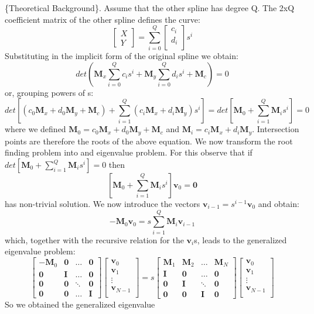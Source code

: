 \{Theoretical Background\}. Assume that the other spline has degree Q. The 2x\+Q coefficient matrix of the other spline defines the curve\+: \[ \left[\begin{array}{c} X\\ Y \end{array}\right]=\sum_{i=0}^Q \left[\begin{array}{c} c_i\\ d_i\\ \end{array}\right]s^i \] Substituting in the implicit form of the original spline we obtain\+: \[ det\left(\mathbf{M}_x\sum_{i=0}^Qc_is^i+\mathbf{M}_y\sum_{i=0}^Qd_is^i+\mathbf{M}_c\right)=0 \] or, grouping powers of s\+: \[ det\left[\left(c_0\mathbf{M}_x+d_0\mathbf{M}_y+\mathbf{M}_c\right)+\sum_{i=1}^Q\left(c_i\mathbf{M}_x+d_i\mathbf{M}_y\right)s^i\right] =det\left[\mathbf{M}_0+\sum_{i=1}^Q\mathbf{M}_is^i\right]=0 \] where we defined $\mathbf{M}_0=c_0\mathbf{M}_x+d_0\mathbf{M}_y+\mathbf{M}_c$ and $\mathbf{M}_i=c_i\mathbf{M}_x+d_i\mathbf{M}_y$. Intersection points are therefore the roots of the above equation. We now transform the root finding problem into and eigenvalue problem. For this observe that if $det\left[\mathbf{M}_0+\sum_{i=1}^Q\mathbf{M}_is^i\right]=0$ then \[ \left[\mathbf{M}_0+\sum_{i=1}^Q\mathbf{M}_is^i\right] \mathbf{v}_0=\mathbf{0} \] has non-\/trivial solution. We now introduce the vectors $\mathbf{v}_{i-1}=s^{i-1}\mathbf{v}_0$ and obtain\+: \[ -\mathbf{M}_0\mathbf{v}_0 = s\sum_{i=1}^Q\mathbf{M}_i\mathbf{v}_{i-1} \] which, together with the recursive relation for the $\mathbf{v}_i$\textquotesingle{}s, leads to the generalized eigenvalue problem\+: \[ \left[\begin{array}{cccc} -\mathbf{M}_0& \mathbf{0}& \ldots& \mathbf{0}\\ \mathbf{0}& \mathbf{I}& \ldots& \mathbf{0}\\ \mathbf{0}& \mathbf{0}& \ddots& \mathbf{0}\\ \mathbf{0}& \mathbf{0}& \ldots& \mathbf{I} \end{array}\right] \left[\begin{array}{c} \mathbf{v}_0\\ \mathbf{v}_1\\ \vdots\\ \mathbf{v}_{N-1}\\ \end{array}\right]=s \left[\begin{array}{cccc} \mathbf{M}_1& \mathbf{M}_2& \ldots& \mathbf{M}_N\\ \mathbf{I}& \mathbf{0}& \ldots& \mathbf{0}\\ \mathbf{0}& \mathbf{I}& \ddots& \mathbf{0}\\ \mathbf{0}& \mathbf{0}& \mathbf{I}& \mathbf{0} \end{array}\right] \left[\begin{array}{c} \mathbf{v}_0\\ \mathbf{v}_1\\ \vdots\\ \mathbf{v}_{N-1}\\ \end{array}\right] \] So we obtained the generalized eigenvalue 